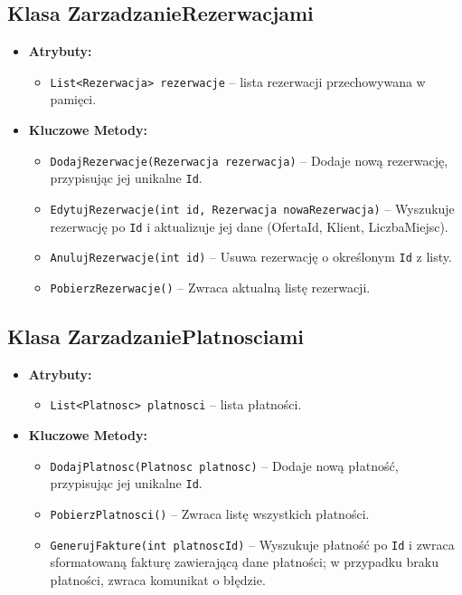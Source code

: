 \subsection*{Klasa \textbf{ZarzadzanieRezerwacjami}}
\begin{itemize}
    \item \textbf{Atrybuty:}
    \begin{itemize}
        \item \texttt{List<Rezerwacja> rezerwacje} -- lista rezerwacji przechowywana w pamięci.
    \end{itemize}
    \item \textbf{Kluczowe Metody:}
    \begin{itemize}
        \item \texttt{DodajRezerwacje(Rezerwacja rezerwacja)} -- Dodaje nową rezerwację, przypisując jej unikalne \texttt{Id}.
        \item \texttt{EdytujRezerwacje(int id, Rezerwacja nowaRezerwacja)} -- Wyszukuje rezerwację po \texttt{Id} i aktualizuje jej dane (OfertaId, Klient, LiczbaMiejsc).
        \item \texttt{AnulujRezerwacje(int id)} -- Usuwa rezerwację o określonym \texttt{Id} z listy.
        \item \texttt{PobierzRezerwacje()} -- Zwraca aktualną listę rezerwacji.
    \end{itemize}
\end{itemize}

\subsection*{Klasa \textbf{ZarzadzaniePlatnosciami}}
\begin{itemize}
    \item \textbf{Atrybuty:}
    \begin{itemize}
        \item \texttt{List<Platnosc> platnosci} -- lista płatności.
    \end{itemize}
    \item \textbf{Kluczowe Metody:}
    \begin{itemize}
        \item \texttt{DodajPlatnosc(Platnosc platnosc)} -- Dodaje nową płatność, przypisując jej unikalne \texttt{Id}.
        \item \texttt{PobierzPlatnosci()} -- Zwraca listę wszystkich płatności.
        \item \texttt{GenerujFakture(int platnoscId)} -- Wyszukuje płatność po \texttt{Id} i zwraca sformatowaną fakturę zawierającą dane płatności; w przypadku braku płatności, zwraca komunikat o błędzie.
    \end{itemize}
\end{itemize}

